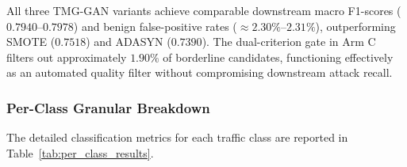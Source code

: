 \documentclass[conference]{IEEEtran}
\begin{document}
All three TMG-GAN variants achieve comparable downstream macro F1-scores ($0.7940$--$0.7978$) and benign false-positive rates ($\approx 2.30\%$--$2.31\%$), outperforming SMOTE ($0.7518$) and ADASYN ($0.7390$). The dual-criterion gate in Arm C filters out approximately $1.90\%$ of borderline candidates, functioning effectively as an automated quality filter without compromising downstream attack recall.

\subsubsection{Per-Class Granular Breakdown}

The detailed classification metrics for each traffic class are reported in Table~\ref{tab:per_class_results}.

\begin{table}[t]
\centering
\caption{Per-Class Classification Metrics on 710,976 Held-Out Test Flows (Mean across 3 Seeds)}
\label{tab:per_class_results}
\end{table}
\end{document}
